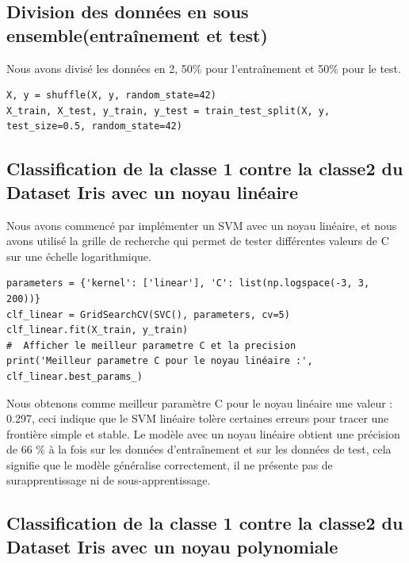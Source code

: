 \documentclass[12pt,a4paper]{report}
\begin{document}
\subsection{Division des données en sous ensemble(entraînement et test)}

Nous avons divisé les données en 2, 50\% pour l’entraînement et 50\% pour le test.
\begin{lstlisting}
X, y = shuffle(X, y, random_state=42)
X_train, X_test, y_train, y_test = train_test_split(X, y, test_size=0.5, random_state=42)
\end{lstlisting}

\subsection{ Classification de la classe 1 contre la classe2 du Dataset Iris avec un noyau linéaire}

Nous avons commencé par implémenter un SVM avec un noyau linéaire, et nous avons utilisé la grille de recherche qui permet de tester différentes valeurs de C sur une échelle logarithmique.
\begin{lstlisting}
parameters = {'kernel': ['linear'], 'C': list(np.logspace(-3, 3, 200))}
clf_linear = GridSearchCV(SVC(), parameters, cv=5)
clf_linear.fit(X_train, y_train)
#  Afficher le meilleur parametre C et la precision
print('Meilleur parametre C pour le noyau linéaire :', clf_linear.best_params_)
\end{lstlisting}
Nous obtenons comme meilleur paramètre C pour le noyau linéaire une valeur : 0.297, ceci indique que le SVM linéaire tolère certaines erreurs pour tracer une frontière simple et stable. Le modèle avec un noyau linéaire obtient une précision de 66 \% à la fois sur les données d’entraînement et sur les données de test, cela signifie que le modèle généralise correctement, il ne présente pas de surapprentissage ni de sous-apprentissage.

\subsection{ Classification de la classe 1 contre la classe2 du Dataset Iris avec un noyau polynomiale}
\end{document}
